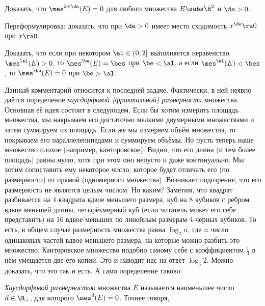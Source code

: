 \documentclass[a4paper]{article}
\begin{document}
\begin{problem}
Доказать, что $\mes^{2+\de}(E)=0$ для любого множества $E\subs\R^2$ и $\de > 0$.
\end{problem}
\begin{hint}
Переформулировка: доказать, что при $\de>0$ имеет место сходимость $x^\de \ra 0$ при $x\ra 0$.
\end{hint}

\begin{problem}
Доказать, что если при некотором $\al \in (0,2]$ выполняется неравенство $\mes^\al(E)>0$, то $\mes^\be(E)=\bes$
при $\be < \al$, а  если $\mes^\al(E)<\bes$, то $\mes^\be(E)=0$ при $\be > \al$.
\end{problem}

\begin{petit}
Данный комментарий относится к последней задаче. Фактически, в ней неявно даётся определение \emph{хаусдорфовой
(фрактальной) размерности} множества. Основная её идея состоит в следующем. Если бы хотим измерить площадь множества,
мы накрываем его достаточно мелкими двумерными множествами и затем суммируем их площадь. Если же мы измеряем объём
множества, то покрываем его параллелепипедами и суммируем объёмы. Но пусть теперь наше множество плохое (например,
канторовское). Видно, что его длина (и тем более площадь) равны нулю, хотя при этом оно непусто и даже континуально.
Мы хотим сопоставить ему некоторое число, которое будет отличать его (по размерности) от прямой (одномерного множества).
Возникает подозрение, что его размерность не является целым числом. Но каким? Заметим, что квадрат разбивается на
4 квадрата вдвое меньшего размера, куб на 8 кубиков с ребром вдвое меньшей длины, четырёхмерный
куб (если читатель может его себе представить) на 16 вдвое меньших по линейным размерам 4-черных кубиков.
То есть, в общем случае размерность множества равна $\log_2 n$, где $n$ число одинаковых частей вдвое
меньшего размера, на которые можно разбить это множество. Канторовское множество подобно самому себе с
коэффициентом $\frac13$ в нём умещается две его копии. Это и наводит нас на ответ $\log_3 2$. Можно доказать, что
это так и есть. А само определение таково:

\begin{df}
\emph{Хаусдорфовой размерностью} множества $E$ называется наименьшее число $d \in \R_+$,
для которого $\mes^d(E)=0$. Точнее говоря,
\end{df}
\end{petit}
\end{document}
